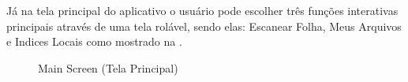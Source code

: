     Já na tela principal do aplicativo o usuário pode escolher três funções interativas principais através de uma tela rolável, sendo elas: Escanear Folha, Meus Arquivos e Indices Locais como mostrado na   .

    \begin{figure}[H]
        \centering
        \caption{Main Screen (Tela Principal)}%
        \label{phot:pg-3}
    \end{figure}

